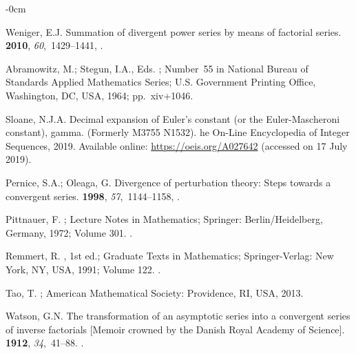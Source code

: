 \documentclass[axioms,article,accept,oneauthor,pdftex]{Definitions/mdpi}
\begin{document}
\begin{adjustwidth}{-\extralength}{0cm}
\begin{thebibliography}{999}
Weniger, E.J.
\newblock Summation of divergent power series by means of factorial series.
 {\bf 2010}, {\em 60},~1429--1441,
.

Abramowitz, M.; Stegun, I.A., Eds.
; Number~55 in National Bureau of Standards Applied
  Mathematics Series; U.S. Government Printing Office, Washington, DC, USA, 1964;
  pp.~xiv+1046.

Sloane, N.J.A.
 {D}ecimal expansion of {E}uler's constant (or the
  {E}uler-{M}ascheroni constant), gamma. ({F}ormerly M3755 N1532).
he On-Line Encyclopedia of Integer Sequences,  2019.
\newblock   Available online: \url{https://oeis.org/A027642}
\newblock (accessed on 17 July 2019).

Pernice, S.A.; Oleaga, G.
\newblock Divergence of perturbation theory: {S}teps towards a convergent
  series.
 {\bf 1998}, {\em 57},~1144--1158,
.

Pittnauer, F.
; {
  Lecture Notes in Mathematics}; Springer: Berlin/Heidelberg, Germany, 1972; Volume 301.
.

Remmert, R.
, 1st ed.;  {Graduate
  Texts in Mathematics}; Springer-Verlag: New York, NY, USA, 1991; Volume 122.
.

Tao, T.
; American Mathematical Society:
  Providence, RI, USA, 2013.

Watson, G.N.
\newblock The transformation of an asymptotic series into a convergent series
  of inverse factorials [Memoir crowned by the {D}anish {R}oyal {A}cademy of
  {S}cience].
 {\bf 1912}, {\em
  34},~41--88.
.


\end{thebibliography}
\end{adjustwidth}
\end{document}
